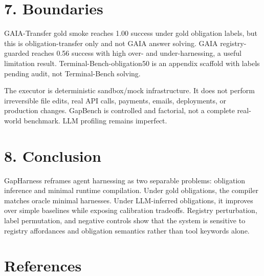 \documentclass[
  10pt,
]{article}
\begin{document}
\section{7. Boundaries}\label{boundaries}

GAIA-Transfer gold smoke reaches 1.00 success under gold obligation
labels, but this is obligation-transfer only and not GAIA answer
solving. GAIA registry-guarded reaches 0.56 success with high over- and
under-harnessing, a useful limitation result.
Terminal-Bench-obligation50 is an appendix scaffold with labels pending
audit, not Terminal-Bench solving.

The executor is deterministic sandbox/mock infrastructure. It does not
perform irreversible file edits, real API calls, payments, emails,
deployments, or production changes. GapBench is controlled and
factorial, not a complete real-world benchmark. LLM profiling remains
imperfect.

\section{8. Conclusion}\label{conclusion}

GapHarness reframes agent harnessing as two separable problems:
obligation inference and minimal runtime compilation. Under gold
obligations, the compiler matches oracle minimal harnesses. Under
LLM-inferred obligations, it improves over simple baselines while
exposing calibration tradeoffs. Registry perturbation, label
permutation, and negative controls show that the system is sensitive to
registry affordances and obligation semantics rather than tool keywords
alone.

\section*{References}\label{references}
\end{document}
